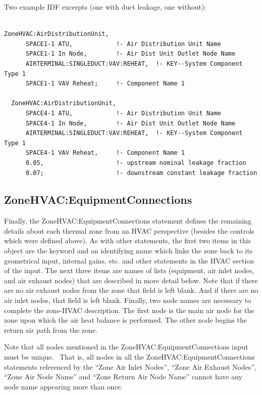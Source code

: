 Two example IDF excerpts (one with duct leakage, one without):

\begin{lstlisting}

ZoneHVAC:AirDistributionUnit,
      SPACE1-1 ATU,            !- Air Distribution Unit Name
      SPACE1-1 In Node,        !- Air Dist Unit Outlet Node Name
      AIRTERMINAL:SINGLEDUCT:VAV:REHEAT,  !- KEY--System Component Type 1
      SPACE1-1 VAV Reheat;     !- Component Name 1

  ZoneHVAC:AirDistributionUnit,
      SPACE4-1 ATU,            !- Air Distribution Unit Name
      SPACE4-1 In Node,        !- Air Dist Unit Outlet Node Name
      AIRTERMINAL:SINGLEDUCT:VAV:REHEAT,  !- KEY--System Component Type 1
      SPACE4-1 VAV Reheat,     !- Component Name 1
      0.05,                    !- upstream nominal leakage fraction
      0.07;                    !- downstream constant leakage fraction
\end{lstlisting}

\subsection{ZoneHVAC:EquipmentConnections}\label{zonehvacequipmentconnections}

Finally, the ZoneHVAC:EquipmentConnections statement defines the remaining details about each thermal zone from an HVAC perspective (besides the controls which were defined above). As with other statements, the first two items in this object are the keyword and an identifying name which links the zone back to its geometrical input, internal gains, etc. and other statements in the HVAC section of the input. The next three items are names of lists (equipment, air inlet nodes, and air exhaust nodes) that are described in more detail below. Note that if there are no air exhaust nodes from the zone that field is left blank. And if there are no air inlet nodes, that field is left blank. Finally, two node names are necessary to complete the zone-HVAC description. The first node is the main air node for the zone upon which the air heat balance is performed. The other node begins the return air path from the zone.

Note that all nodes mentioned in the ZoneHVAC:EquipmentConnections input must be unique.~ That is, all nodes in all the ZoneHVAC:EquipmentConnections statements referenced by the ``Zone Air Inlet Nodes'', ``Zone Air Exhaust Nodes'', ``Zone Air Node Name'' and ``Zone Return Air Node Name'' cannot have any node name appearing more than once.

